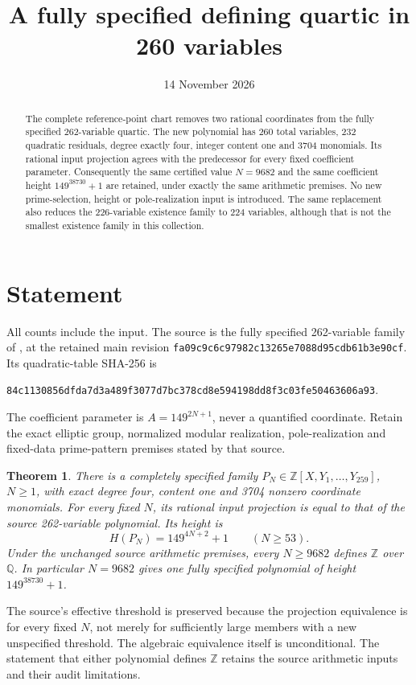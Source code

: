 \documentclass[11pt,a4paper]{article}
\title{A fully specified defining quartic in 260 variables}
\author{}\date{14 November 2026}
\newtheorem{theorem}{Theorem}[section]\newtheorem{lemma}[theorem]{Lemma}
\newcommand{\Q}{\mathbb Q}\newcommand{\Z}{\mathbb Z}
\begin{document}
\maketitle
\begin{abstract}
The complete reference-point chart removes two rational coordinates
from the fully specified 262-variable quartic. The new polynomial has
260 total variables, 232 quadratic residuals, degree exactly four,
integer content one and 3704 monomials. Its rational input projection
agrees with the predecessor for every fixed coefficient parameter.
Consequently the same certified value $N=9682$ and the same coefficient
height $149^{38730}+1$ are retained, under exactly the same arithmetic
premises. No new prime-selection, height or pole-realization input is
introduced. The same replacement also reduces the 226-variable
existence family to 224 variables, although that is not the smallest
existence family in this collection.
\end{abstract}

\section{Statement}
All counts include the input. The source is the fully specified
262-variable family of \cite{Parent}, at the retained main revision
\texttt{fa09c9c6c97982c13265e7088d95cdb61b3e90cf}. Its quadratic-table
SHA-256 is
\begin{center}\small
\texttt{84c1130856dfda7d3a489f3077d7bc378cd8e594198dd8f3c03fe50463606a93}.
\end{center}
The coefficient parameter is $A=149^{2N+1}$, never a quantified
coordinate. Retain the exact elliptic group, normalized modular
realization, pole-realization and fixed-data prime-pattern premises
stated by that source.

\begin{theorem}\label{thm:main}
There is a completely specified family
$P_N\in\Z[X,Y_1,\ldots,Y_{259}]$, $N\ge1$, with exact degree four,
content one and 3704 nonzero coordinate monomials. For every fixed
$N$, its rational input projection is equal to that of the source
262-variable polynomial. Its height is
\[
                  H(P_N)=149^{4N+2}+1\qquad(N\ge53).
\]
Under the unchanged source arithmetic premises, every $N\ge9682$
defines $\Z$ over $\Q$. In particular $N=9682$ gives one fully
specified polynomial of height $149^{38730}+1$.
\end{theorem}

The source's effective threshold is preserved because the projection
equivalence is for every fixed $N$, not merely for sufficiently large
members with a new unspecified threshold. The algebraic equivalence
itself is unconditional. The statement that either polynomial defines
$\Z$ retains the source arithmetic inputs and their audit limitations.
\end{document}
